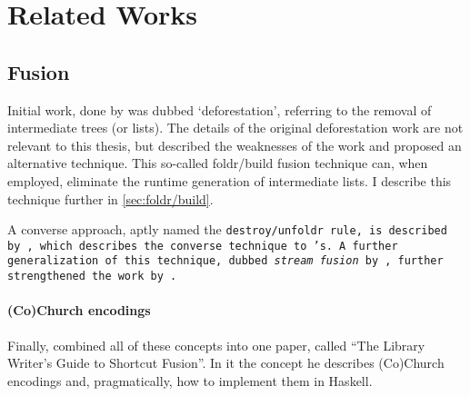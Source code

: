\section{Related Works}\label{sec:related}

\subsection{Fusion}
Initial work, done by \cite{Wadler1984,Wadler1986,Wadler1990} was dubbed `deforestation', referring to the removal of intermediate trees (or lists).
The details of the original deforestation work are not relevant to this thesis, but \cite{Gill1993} described the weaknesses of the work and proposed an alternative technique.
This so-called foldr/build fusion technique can, when employed, eliminate the runtime generation of intermediate lists.
I describe this technique further in \autoref{sec:foldr/build}.

A converse approach, aptly named the \tt{destroy/unfoldr} rule, is described by \cite{Svenningsson2002}, which describes the converse technique to \cite{Gill1993}'s.
A further generalization of this technique, dubbed \textit{stream fusion} by \cite{Coutts2007}, further strengthened the work by \cite{Svenningsson2002}.

\paragraph{(Co)Church encodings}
Finally, \cite{Harper2011} combined all of these concepts into one paper, called ``The Library Writer's Guide to Shortcut Fusion''.
In it the concept he describes (Co)Church encodings and, pragmatically, how to implement them in Haskell.